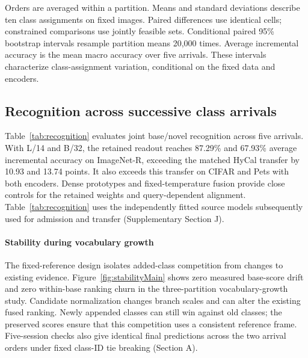 \documentclass[preprint,review,12pt]{elsarticle}
\begin{document}
Orders are averaged within a partition. Means and standard deviations describe ten class assignments on fixed images. Paired differences use identical cells; constrained comparisons use jointly feasible sets. Conditional paired 95\% bootstrap intervals resample partition means 20,000 times. Average incremental accuracy is the mean macro accuracy over five arrivals. These intervals characterize class-assignment variation, conditional on the fixed data and encoders.

\subsection{Recognition across successive class arrivals}
Table~\ref{tab:recognition} evaluates joint base/novel recognition across five arrivals. With L/14 and B/32, the retained readout reaches 87.29\% and 67.93\% average incremental accuracy on ImageNet-R, exceeding the matched HyCal transfer by 10.93 and 13.74 points. It also exceeds this transfer on CIFAR and Pets with both encoders. Dense prototypes and fixed-temperature fusion provide close controls for the retained weights and query-dependent alignment. Table~\ref{tab:recognition} uses the independently fitted source models subsequently used for admission and transfer (Supplementary Section J).

\begin{table}[!htbp]
\centering\setlength{\belowcaptionskip}{8pt}
\caption{Average incremental macro accuracy across five arrivals (\%). Fusion and offsets are selected by base-only pseudo-expansion and remain fixed. Each cell gives mean $\pm$ sample standard deviation over ten partitions after averaging two orders. All readouts share frozen encoders, fitting/tuning data and five-shot novel support. HyCal is the matched transfer described in Section M. Bold marks the largest mean in each column and encoder.}
\label{tab:recognition}
{\small\setlength{\tabcolsep}{5pt}\renewcommand{\arraystretch}{1.15}}
\end{table}

\paragraph{Stability during vocabulary growth}
The fixed-reference design isolates added-class competition from changes to existing evidence. Figure~\ref{fig:stabilityMain} shows zero measured base-score drift and zero within-base ranking churn in the three-partition vocabulary-growth study. Candidate normalization changes branch scales and can alter the existing fused ranking. Newly appended classes can still win against old classes; the preserved scores ensure that this competition uses a consistent reference frame. Five-session checks also give identical final predictions across the two arrival orders under fixed class-ID tie breaking (Section A).
\end{document}
